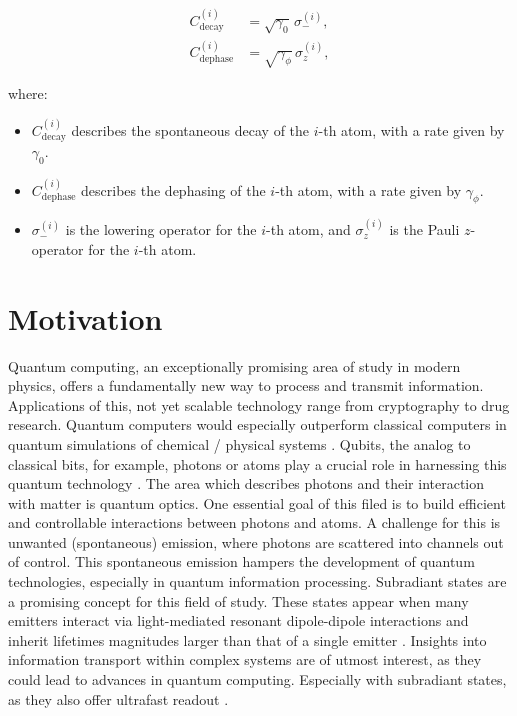 \begin{align}
    C_{\text{decay}}^{(i)} &= \sqrt{\gamma_0} \, \sigma_-^{(i)}, \\
    C_{\text{dephase}}^{(i)} &= \sqrt{\gamma_\phi} \, \sigma_z^{(i)},
\end{align}

where:
\begin{itemize}
    \item \( C_{\text{decay}}^{(i)} \) describes the spontaneous decay of the \(i\)-th atom, with a rate given by \(\gamma_0\).
    \item \( C_{\text{dephase}}^{(i)} \) describes the dephasing of the \(i\)-th atom, with a rate given by \(\gamma_\phi\).
    \item \( \sigma_-^{(i)} \) is the lowering operator for the \(i\)-th atom, and \( \sigma_z^{(i)} \) is the Pauli \( z \)-operator for the \(i\)-th atom.
\end{itemize}



\newpage











\section{Motivation}
\noindent
Quantum computing, an exceptionally promising area of study in modern physics, offers a fundamentally new way to process and transmit information.
Applications of this, not yet scalable technology range from cryptography to drug research.
Quantum computers would especially outperform classical computers in quantum simulations of chemical / physical systems \cite{Eddins2022}.
Qubits, the analog to classical bits, for example,
photons or atoms play a crucial role in harnessing this quantum technology \cite{Ramakrishnan2023}.
The area which describes photons and their interaction with matter is quantum optics.
One essential goal of this filed is to build efficient and controllable interactions between photons and atoms.
A challenge for this is unwanted (spontaneous) emission, where photons are scattered into channels out of control.
This spontaneous emission hampers the development of quantum technologies, especially in quantum information processing.
Subradiant states are a promising concept for this field of study.
These states appear when many emitters interact via light-mediated resonant dipole-dipole interactions
and inherit lifetimes magnitudes larger than that of a single emitter \cite{AsenjoGarcia2017}.
Insights into information transport within complex systems are of utmost interest,
as they could lead to advances in quantum computing. %
Especially with subradiant states, as they also offer ultrafast readout \cite{Scully2015}.

